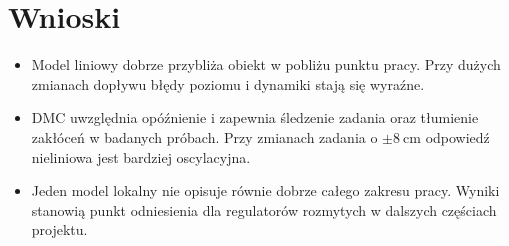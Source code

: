 \section{Wnioski}
\begin{itemize}
\item Model liniowy dobrze przybliża obiekt w pobliżu punktu pracy. Przy dużych zmianach dopływu błędy poziomu i dynamiki stają się wyraźne.
\item DMC uwzględnia opóźnienie i zapewnia śledzenie zadania oraz tłumienie zakłóceń w badanych próbach. Przy zmianach zadania o $\pm8\ \mathrm{cm}$ odpowiedź nieliniowa jest bardziej oscylacyjna.
\item Jeden model lokalny nie opisuje równie dobrze całego zakresu pracy. Wyniki stanowią punkt odniesienia dla regulatorów rozmytych w dalszych częściach projektu.
\end{itemize}
